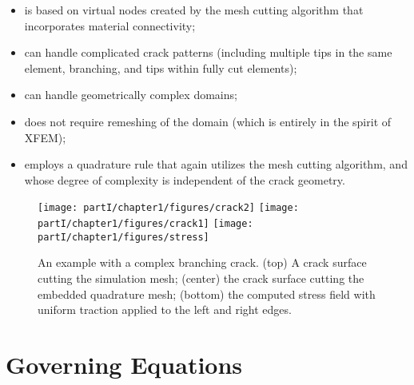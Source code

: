 \begin{itemize}
\item is based on virtual nodes created by the mesh cutting algorithm that incorporates material connectivity;
\item can handle complicated crack patterns (including multiple tips in the same element, branching, and tips within fully cut elements);
\item can handle geometrically complex domains;
\item does not require remeshing of the domain (which is entirely in the spirit of XFEM);
\item employs a quadrature rule that again utilizes the mesh cutting algorithm, and whose degree of complexity is independent of the crack geometry.
\end{itemize}

\setlength{\figurewidth}{0.79\textwidth}
\begin{figure}[htbp]
\centering
\texttt{[image: partI/chapter1/figures/crack2]}
\texttt{[image: partI/chapter1/figures/crack1]}
\texttt{[image: partI/chapter1/figures/stress]}
\caption{An example with a complex branching crack. (top) A crack surface cutting the simulation mesh; (center) the crack surface cutting the embedded quadrature mesh; (bottom) the computed stress field with uniform traction applied to the left and right edges.}
\label{fig:chap1.introexample}
\end{figure}

\section{Governing Equations}

